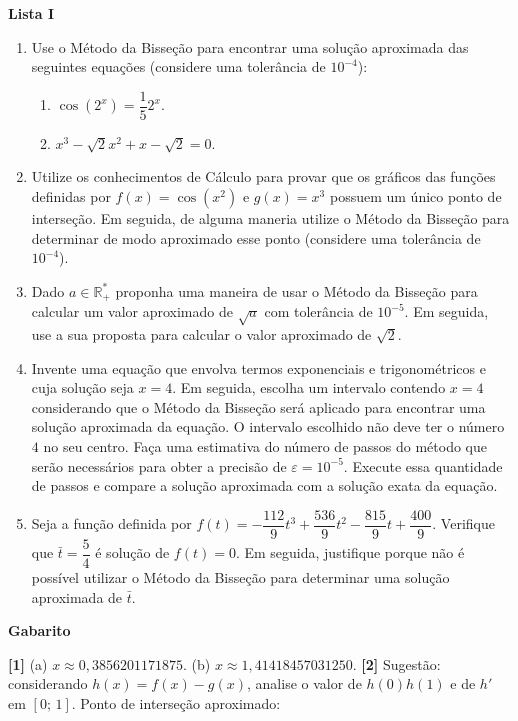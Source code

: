 \documentclass[12pt,a4paper]{article}
\begin{document}
\begin{center}
  \textbf{Lista I}
\end{center}

\begin{enumerate}
\item Use o Método da Bisseção para encontrar uma solução aproximada das seguintes equações (considere uma tolerância de $10^{-4}$):
 \begin{enumerate}
  \item $\cos\left(2^x\right) = \dfrac{1}{5}2^x$.
  \item $x^3 - \sqrt{2}x^2 + x - \sqrt{2} = 0$.
 \end{enumerate}

 \item Utilize os conhecimentos de Cálculo para provar que os gráficos das funções definidas por 
$f(x) = \cos\left(x^2\right)$ e $g(x) = x^3$ possuem um único ponto de interseção. Em seguida, 
de alguma maneria utilize o Método da Bisseção para determinar de modo aproximado esse ponto 
(considere uma tolerância de $10^{-4}$).

 \item Dado $a\in\mathbb{R}_+^*$ proponha uma maneira de usar o Método da Bisseção para calcular um valor aproximado de $\sqrt{a}$ com tolerância de $10^{-5}$. Em seguida, use a sua 
proposta para calcular o valor aproximado de $\sqrt{2}$.

 \item Invente uma equação que envolva termos exponenciais e trigonométricos e cuja solução seja $x = 4$. Em seguida, escolha um intervalo 
contendo $x = 4$ considerando que o Método da Bisseção será aplicado para encontrar uma solução 
aproximada da equação. O intervalo escolhido não deve ter o número $4$ no seu centro. 
Faça uma estimativa do número de passos do método que 
serão necessários para obter a precisão de $\varepsilon = 10^{-5}$. Execute essa quantidade de passos e compare a solução 
aproximada com a solução exata da equação.

 \item Seja a função definida por $f(t) =  -\dfrac{112}{9}t^3 + \dfrac{536}{9}t^2 -\dfrac{815}{9}t + \dfrac{400}{9}$. Verifique que $\bar{t} = \dfrac{5}{4}$ é solução de $f(t) = 0$. 
Em seguida, justifique porque não é possível utilizar o Método da Bisseção para determinar uma solução aproximada de $\bar{t}$.

\end{enumerate}

\begin{center}
\textbf{Gabarito}
\end{center}
\textbf{[1]} (a) $x\approx 0,3856201171875$. (b) $x\approx 1,41418457031250$. 
\textbf{[2]} Sugestão: considerando $h(x) = f(x) - g(x)$, analise o valor de 
$h(0)h(1)$ e de $h'$ em $[0;\,1]$. Ponto de interseção aproximado: 
\end{document}
